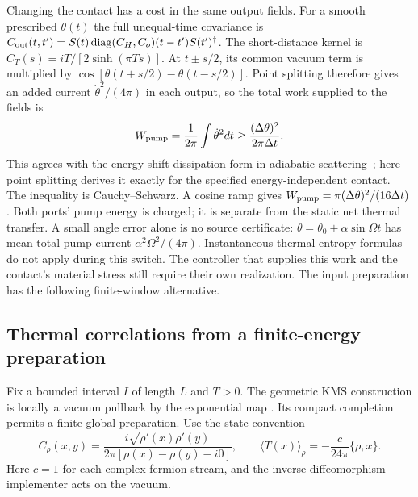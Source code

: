 Changing the contact has a cost in the same output fields. For a smooth
prescribed $\theta(t)$ the full unequal-time covariance is
$C_{\rm out}(t,t')=S(t)\operatorname{diag}(C_H,C_o)(t-t')S(t')^\dagger$.
The short-distance kernel is
$C_T(s)=iT/[2\sinh(\pi Ts)]$.
At $t\pm s/2$, its common vacuum term is multiplied by
$\cos[\theta(t+s/2)-\theta(t-s/2)]$.
Point splitting therefore gives an added current $\dot\theta^2/(4\pi)$
in each output, so the total work supplied to the fields is
\begin{equation}\label{eq:contact-pump}
 W_{\rm pump}=\frac1{2\pi}\int\dot\theta^2dt
       \ge\frac{(\Delta\theta)^2}{2\pi\Delta t}.
\end{equation}
This agrees with the energy-shift dissipation form in adiabatic
scattering~\cite[Eq.~(8)]{Avron2001}; here point splitting derives it
exactly for the specified energy-independent contact.
The inequality is Cauchy--Schwarz. A cosine ramp gives
$W_{\rm pump}=\pi(\Delta\theta)^2/(16\Delta t)$.
Both ports' pump energy is charged; it is separate from the static net
thermal transfer. A small angle error alone is no source certificate:
$\theta=\theta_0+\alpha\sin\Omega t$ has mean total pump current
$\alpha^2\Omega^2/(4\pi)$.
Instantaneous thermal entropy formulas do not apply during this switch.
The controller that supplies this work and the contact's material stress
still require their own realization. The input preparation has the
following finite-window alternative.

\subsection{Thermal correlations from a finite-energy preparation}
\label{sec:finite-thermal-window}

Fix a bounded interval $I$ of length $L$ and $T>0$. The geometric KMS
construction is locally a vacuum pullback by the exponential map
\cite[Section~2.8, Proposition~2.4 and Theorem~2.5]{Camassa2012KMS}.
Its compact completion permits a finite global preparation. Use the
state convention
\[
 C_\rho(x,y)=\frac{i\sqrt{\rho'(x)\rho'(y)}}
                   {2\pi[\rho(x)-\rho(y)-i0]},\qquad
 \langle T(x)\rangle_\rho=-\frac{c}{24\pi}\{\rho,x\}.
\]
Here $c=1$ for each complex-fermion stream, and the inverse
diffeomorphism implementer acts on the vacuum.

